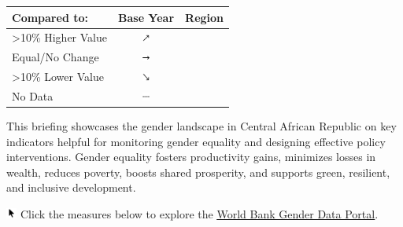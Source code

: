 \documentclass[
]{article}
\author{}
\date{\vspace{-2.5em}}
\begin{document}

\begin{table}\begingroup\fontsize{8}{10}\selectfont

\begin{tabular}[t]{lcl}

\textbf{Compared to:} & \textbf{Base Year} & \textbf{Region}\\
\midrule
>10\% Higher Value & \includegraphics[width=0.1in, height=0.1in]{upicon.png} & \cellcolor[HTML]{21908C}{}\\
Equal/No Change & \includegraphics[width=0.1in, height=0.1in]{righticon.png} & \cellcolor[HTML]{34608D}{}\\
>10\% Lower Value & \includegraphics[width=0.1in, height=0.1in]{downicon.png} & \cellcolor[HTML]{482576}{}\\
No Data & \includegraphics[width=0.1in, height=0.1in]{naicon.png} & \cellcolor{gray}{}\\

\end{tabular}
\endgroup{}\end{table}

\begin{minipage}[t][1.7cm][t]{12cm}
\fontsize{9}{8}\selectfont\raggedright
This briefing showcases the gender landscape in Central African Republic on key indicators helpful for monitoring gender equality and designing effective policy interventions. Gender equality fosters productivity gains, minimizes losses in wealth, reduces poverty, boosts shared prosperity, and supports green, resilient, and inclusive development. 

\includegraphics[width=10pt]{pointer.png} Click the measures below to explore the \underline{\href{https://genderdata.worldbank.org/}{World Bank Gender Data Portal}}.
\end{minipage}
\vspace{6pt}
\end{document}
